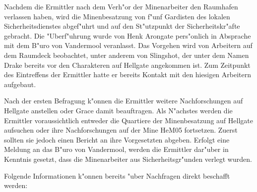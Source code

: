 
Nachdem die Ermittler nach dem Verh"or der Minenarbeiter den Raumhafen verlassen haben, wird die Minenbesatzung von f"unf Gardisten des lokalen Sicherheitsdienstes abgef"uhrt und auf den St"utzpunkt der Sicherheitskr"afte gebracht. Die "Uberf"uhrung wurde von Henk Arongate pers"onlich in Absprache mit dem B"uro von Vandermool veranlasst. Das Vorgehen wird von Arbeitern auf dem Raumdeck beobachtet, unter anderem von Slingshot, der unter dem Namen Drake bereits vor den Charakteren auf Hellgate angekommen ist. Zum Zeitpunkt des Eintreffens der Ermittler hatte er bereits Kontakt mit den hiesigen Arbeitern aufgebaut.

Nach der ersten Befragung k"onnen die Ermittler weitere Nachforschungen auf Hellgate anstellen oder Grace damit beauftragen. Als N"achstes werden die Ermittler voraussichtlich entweder die Quartiere der Minenbesatzung auf Hellgate aufsuchen oder ihre Nachforschungen auf der Mine HeM05 fortsetzen. Zuerst sollten sie jedoch einen Bericht an ihre Vorgesetzten abgeben. Erfolgt eine Meldung an das B"uro von Vandermool, werden die Ermittler dar"uber in Kenntnis gesetzt, dass die Minenarbeiter aus Sicherheitsgr"unden verlegt wurden.

Folgende Informationen k"onnen bereits "uber Nachfragen direkt beschafft werden:

